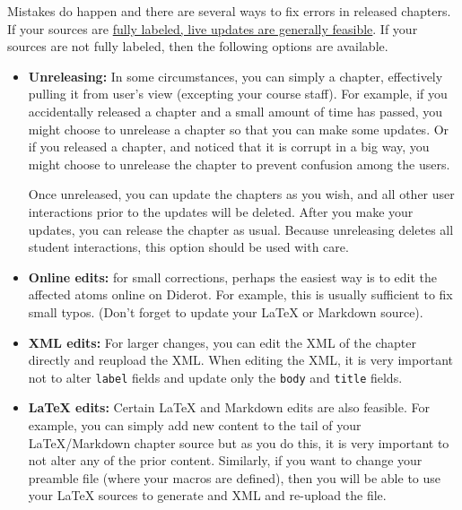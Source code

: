 \begin{gram}
Mistakes do happen and there are several ways to fix errors in released chapters.  
%
If your sources are
\href{sec:publish::full-labeling}{fully labeled, live updates are generally feasible}.
%
If your sources are not fully labeled, then the following options are available. 

\begin{itemize}
\item \textbf{Unreleasing:}
In some circumstances, you can simply  a chapter, effectively pulling it from user's view (excepting your course staff).
%
For example,
if you accidentally released a chapter and a small amount of time has passed, you might choose to unrelease a chapter so that you can make some updates.
%
Or if you released a chapter, and noticed that it is corrupt in a big way, you might choose to unrelease the chapter to prevent confusion among the users.
%

Once unreleased, you can update the chapters as you wish, and all other user interactions  prior to the updates will be deleted.
%
After you make your updates, you can release the chapter as usual.
%
Because unreleasing deletes all student interactions, this option should be used with care.

\item \textbf{Online edits:}
for small corrections, perhaps the easiest way is to edit the affected atoms online on Diderot.  For example, this is usually sufficient to fix small typos.  (Don't forget to update your LaTeX or Markdown source).

\item \textbf{XML edits:}
%
For larger changes, you can edit the XML of the chapter directly and
reupload the XML.  When editing the XML, it is very important not to
alter \lstinline`label` fields and update only the \lstinline`body` and \lstinline`title` fields.

\item \textbf{LaTeX edits:}
Certain LaTeX and Markdown edits are also feasible. 
%
For example, you can simply add new content to the tail of your LaTeX/Markdown chapter source but as you do this, it is very important to not alter any of the prior content. 
%
Similarly, if you want to change your preamble file (where your macros are defined), then you will be able to use your LaTeX sources to generate and XML and re-upload the file. 


\end{itemize}
\end{gram}
